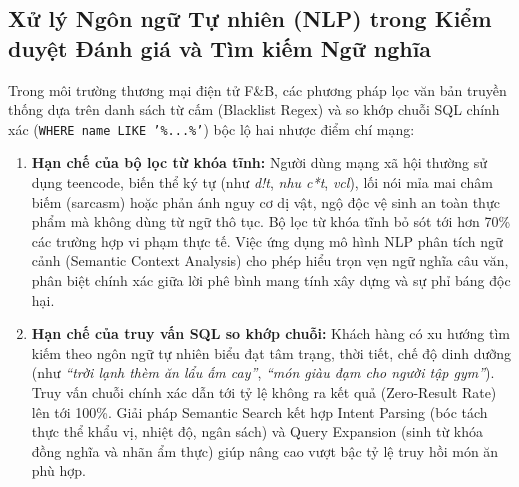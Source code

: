 \documentclass{uetgraduation}
\begin{document}
\subsection{Xử lý Ngôn ngữ Tự nhiên (NLP) trong Kiểm duyệt Đánh giá và Tìm kiếm Ngữ nghĩa}
Trong môi trường thương mại điện tử F\&B, các phương pháp lọc văn bản truyền thống dựa trên danh sách từ cấm (Blacklist Regex) và so khớp chuỗi SQL chính xác (\texttt{WHERE name LIKE '\%...\%'}) bộc lộ hai nhược điểm chí mạng:
\begin{enumerate}
    \item \textbf{Hạn chế của bộ lọc từ khóa tĩnh:} Người dùng mạng xã hội thường sử dụng teencode, biến thể ký tự (như \textit{d!t}, \textit{nhu c*t}, \textit{vcl}), lối nói mỉa mai châm biếm (sarcasm) hoặc phản ánh nguy cơ dị vật, ngộ độc vệ sinh an toàn thực phẩm mà không dùng từ ngữ thô tục. Bộ lọc từ khóa tĩnh bỏ sót tới hơn 70\% các trường hợp vi phạm thực tế. Việc ứng dụng mô hình NLP phân tích ngữ cảnh (Semantic Context Analysis) cho phép hiểu trọn vẹn ngữ nghĩa câu văn, phân biệt chính xác giữa lời phê bình mang tính xây dựng và sự phỉ báng độc hại.
    \item \textbf{Hạn chế của truy vấn SQL so khớp chuỗi:} Khách hàng có xu hướng tìm kiếm theo ngôn ngữ tự nhiên biểu đạt tâm trạng, thời tiết, chế độ dinh dưỡng (như \textit{``trời lạnh thèm ăn lẩu ấm cay''}, \textit{``món giàu đạm cho người tập gym''}). Truy vấn chuỗi chính xác dẫn tới tỷ lệ không ra kết quả (Zero-Result Rate) lên tới 100\%. Giải pháp Semantic Search kết hợp Intent Parsing (bóc tách thực thể khẩu vị, nhiệt độ, ngân sách) và Query Expansion (sinh từ khóa đồng nghĩa và nhãn ẩm thực) giúp nâng cao vượt bậc tỷ lệ truy hồi món ăn phù hợp.
\end{enumerate}
\end{document}
